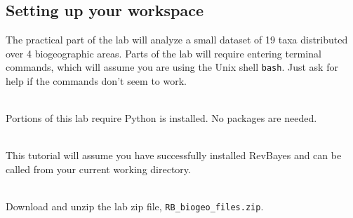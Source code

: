 \subsection{Setting up your workspace}

The practical part of the lab will analyze a small dataset of 19 taxa distributed over 4 biogeographic areas.
Parts of the lab will require entering terminal commands, which will assume you are using the Unix shell \texttt{bash}.
Just ask for help if the commands don't seem to work.

\noindent \\ \impmark Portions of this lab require Python is installed. No packages are needed.

\noindent \\ \impmark This tutorial will assume you have successfully installed RevBayes and can be called from your current working directory.

\noindent \\ \impmark Download and unzip the lab zip file, {\tt RB\_biogeo\_files.zip}.

